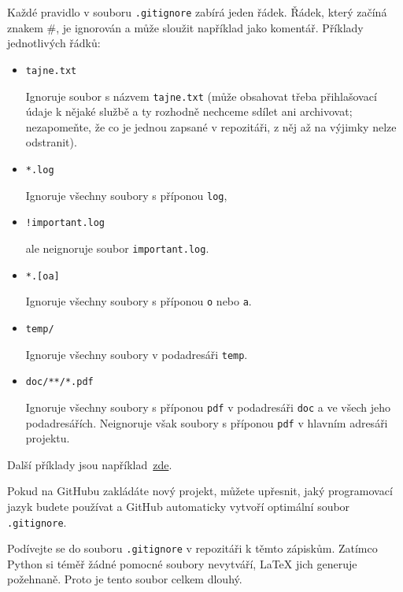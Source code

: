 \documentclass[a4paper,11pt,twoside]{article}
\def\code#1{\textnormal{\texttt{#1}}}
\begin{document}
        Každé pravidlo v souboru \code{.gitignore} zabírá jeden řádek.
        Řádek, který začíná znakem \#, je ignorován a může sloužit například jako komentář.
        Příklady jednotlivých řádků:
        \begin{itemize}
        \item \code{tajne.txt}
            
            Ignoruje soubor s názvem \code{tajne.txt} (může obsahovat třeba přihlašovací údaje k nějaké službě a ty rozhodně nechceme sdílet ani archivovat; nezapomeňte, že co je jednou zapsané v repozitáři, z něj až na výjimky nelze odstranit).

        \item \code{*.log}
        
            Ignoruje všechny soubory s příponou \code{log},

        \item \code{!important.log}

            ale neignoruje soubor \code{important.log}.

        \item \code{*.[oa]}

            Ignoruje všechny soubory s příponou \code{o} nebo \code{a}.

        \item \code{temp/}

            Ignoruje všechny soubory v podadresáři \code{temp}.

        \item \code{doc/**/*.pdf}
        
            Ignoruje všechny soubory s příponou \code{pdf} v podadresáři \code{doc} a ve všech jeho podadresářích.
            Neignoruje však soubory s příponou \code{pdf} v hlavním adresáři projektu.
        \end{itemize}
        Další příklady jsou například~\href{https://www.atlassian.com/git/tutorials/saving-changes/gitignore}{zde}.

        Pokud na GitHubu zakládáte nový projekt, můžete upřesnit, jaký programovací jazyk budete používat a GitHub automaticky vytvoří optimální soubor \code{.gitignore}.

        \begin{task}
            Podívejte se do souboru \code{.gitignore} v repozitáři k těmto zápiskům.
            Zatímco Python si téměř žádné pomocné soubory nevytváří, {\LaTeX} jich generuje požehnaně.
            Proto je tento soubor celkem dlouhý. 
        \end{task}
\end{document}
